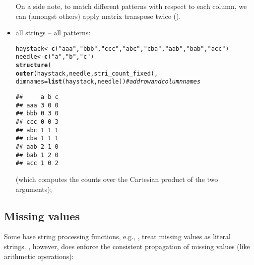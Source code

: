 \documentclass[nojss]{jss}\usepackage[]{graphicx}\usepackage[]{xcolor}
\makeatletter
\newcommand{\hlstr}[1]{\textcolor[rgb]{0.192,0.494,0.8}{#1}}%
\newcommand{\hlcom}[1]{\textcolor[rgb]{0.678,0.584,0.686}{\textit{#1}}}%
\newcommand{\hlstd}[1]{\textcolor[rgb]{0.345,0.345,0.345}{#1}}%
\newcommand{\hlkwb}[1]{\textcolor[rgb]{0.69,0.353,0.396}{#1}}%
\newcommand{\hlkwc}[1]{\textcolor[rgb]{0.333,0.667,0.333}{#1}}%
\newcommand{\hlkwd}[1]{\textcolor[rgb]{0.737,0.353,0.396}{\textbf{#1}}}%
\newenvironment{kframe}{%
 \def\at@end@of@kframe{}%
 \ifinner\ifhmode%
  \def\at@end@of@kframe{\end{minipage}}%
  \begin{minipage}{\columnwidth}%
 \fi\fi%
 \def\FrameCommand##1{\hskip\@totalleftmargin \hskip-\fboxsep
 \colorbox{shadecolor}{##1}\hskip-\fboxsep
     \hskip-\linewidth \hskip-\@totalleftmargin \hskip\columnwidth}%
 \MakeFramed {\advance\hsize-\width
   \@totalleftmargin\z@ \linewidth\hsize
   \@setminipage}}%
 {\par\unskip\endMakeFramed%
 \at@end@of@kframe}
\newenvironment{knitrout}{}{} %
\makeatother
\begin{document}
\begin{itemize}
\medskip
On a side note, to match different patterns
with respect to each column, we can (amongst others)
apply matrix transpose twice ().



\item all strings -- all patterns:


\begin{knitrout}
\color{fgcolor}\begin{kframe}
\begin{alltt}
\hlstd{haystack} \hlkwb{<-} \hlkwd{c}\hlstd{(}\hlstr{"aaa"}\hlstd{,} \hlstr{"bbb"}\hlstd{,} \hlstr{"ccc"}\hlstd{,} \hlstr{"abc"}\hlstd{,} \hlstr{"cba"}\hlstd{,} \hlstr{"aab"}\hlstd{,} \hlstr{"bab"}\hlstd{,} \hlstr{"acc"}\hlstd{)}
\hlstd{needle} \hlkwb{<-} \hlkwd{c}\hlstd{(}\hlstr{"a"}\hlstd{,} \hlstr{"b"}\hlstd{,} \hlstr{"c"}\hlstd{)}
\hlkwd{structure}\hlstd{(}
  \hlkwd{outer}\hlstd{(haystack, needle, stri_count_fixed),}
  \hlkwc{dimnames}\hlstd{=}\hlkwd{list}\hlstd{(haystack, needle))}  \hlcom{# add row and column names}
\end{alltt}
\begin{verbatim}
##     a b c
## aaa 3 0 0
## bbb 0 3 0
## ccc 0 0 3
## abc 1 1 1
## cba 1 1 1
## aab 2 1 0
## bab 1 2 0
## acc 1 0 2
\end{verbatim}
\end{kframe}
\end{knitrout}

(which computes the counts over the Cartesian product
of the two arguments);



\end{itemize}






\subsection{Missing values}

Some base  string processing functions,
e.g., , treat missing values as literal 
strings.
, however, does enforce the consistent
propagation of missing values (like arithmetic operations):
\end{document}
